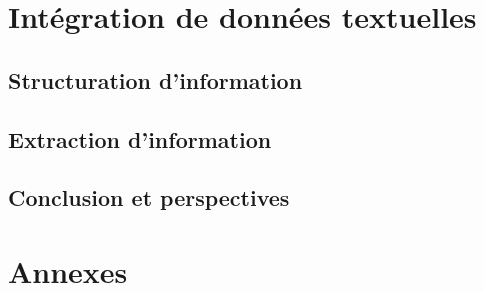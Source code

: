 \part{Intégration de données textuelles}
\label{part:texts}
\glsresetall


\chapter{Structuration d'information}
\label{chp:struct}
\minitoc


\chapter{Extraction d'information}
\label{chp:tal}
\minitoc




\chapter{Conclusion et perspectives}


\cleardoublepage    %
\appendix
{}
\part{Annexes}
\glsresetall
{}

\clearpage
\backmatter


\printglossary
{}
\printglossary[type=acronym]
